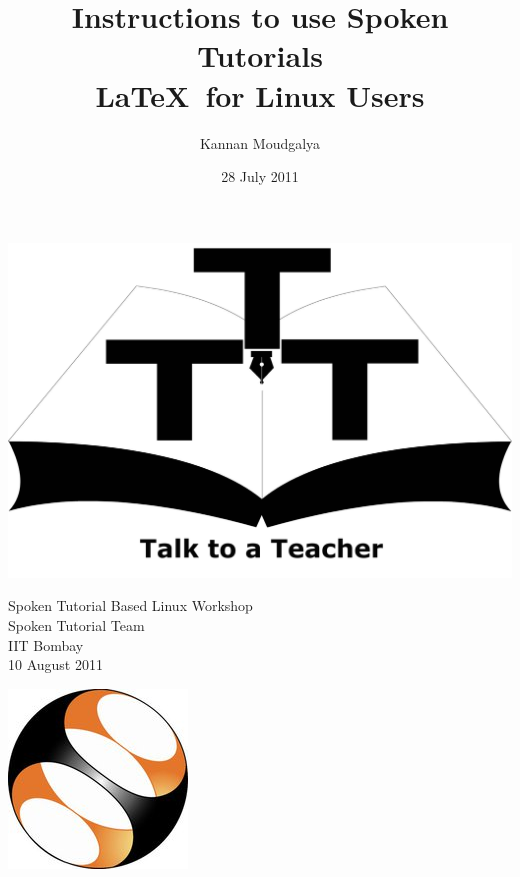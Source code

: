 \documentclass[11pt]{article}
\title{Instructions to use Spoken Tutorials \\
\LaTeX\ for Linux Users}
\author{Kannan Moudgalya}
\date{28 July 2011}
\begin{document}
\begin{minipage}[t]{0.15\textwidth}
\includegraphics[width=\linewidth]{3t-logo}
\end{minipage} \hfill
\begin{minipage}[t]{0.65\textwidth}
\begin{center}
\vspace{-0.7in}
\Large
Spoken Tutorial Based Linux Workshop \\
\large
Spoken Tutorial Team \\
IIT Bombay \\
10 August 2011
\end{center}
\end{minipage} \hfill
\begin{minipage}[t]{0.12\textwidth}
\includegraphics[width=\linewidth]{st-logo.jpg}
\end{minipage}
\end{document}
